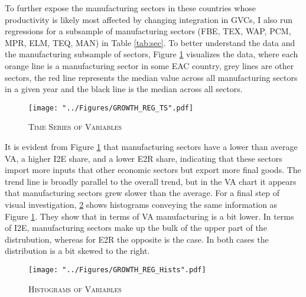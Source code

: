 \documentclass[a4paper]{article}
\begin{document}
To further expose the manufacturing sectors in these countries whose productivity is likely most affected by changing integration in GVCs, I also run regressions for a subsample of manufacturing sectors (FBE, TEX, WAP, PCM, MPR, ELM, TEQ, MAN) in Table \ref{tab:sec}. To better understand the data and the manufacturing subsample of sectors, Figure \ref{fig:GROWTH_REG_TS} visualizes the data, where each orange line is a manufacturing sector in some EAC country, grey lines are other sectors, the red line represents the median value across all manufacturing sectors in a given year and the black line is the median across all sectors.  


\begin{figure}[h!]
\centering
\caption{\label{fig:GROWTH_REG_TS}\textsc{Time Series of Variables}}
\texttt{[image: "../Figures/GROWTH\_REG\_TS".pdf]} %
\end{figure}
\FloatBarrier

It is evident from Figure \ref{fig:GROWTH_REG_TS} that manufacturing sectors have a lower than average VA, a higher I2E share, and a lower E2R share, indicating that these sectors import more inputs that other economic sectors but export more final goods. The trend line is broadly parallel to the overall trend, but in the VA chart it appears that manufacturing sectors grew slower than the average. For a final step of visual investigation, \ref{fig:GROWTH_REG_Hists} shows histograms conveying the same information as Figure \ref{fig:GROWTH_REG_TS}. They show that in terms of VA manufacturing is a bit lower. %
In terms of I2E, manufacturing sectors make up the bulk of the upper part of the distrubution, whereas for E2R the opposite is the case. In both cases the distribution is a bit skewed to the right. 

\begin{figure}[h!]
\centering
\caption{\label{fig:GROWTH_REG_Hists}\textsc{Histograms of Variables}}
\texttt{[image: "../Figures/GROWTH\_REG\_Hists".pdf]} %
\end{figure}
\FloatBarrier
\end{document}
